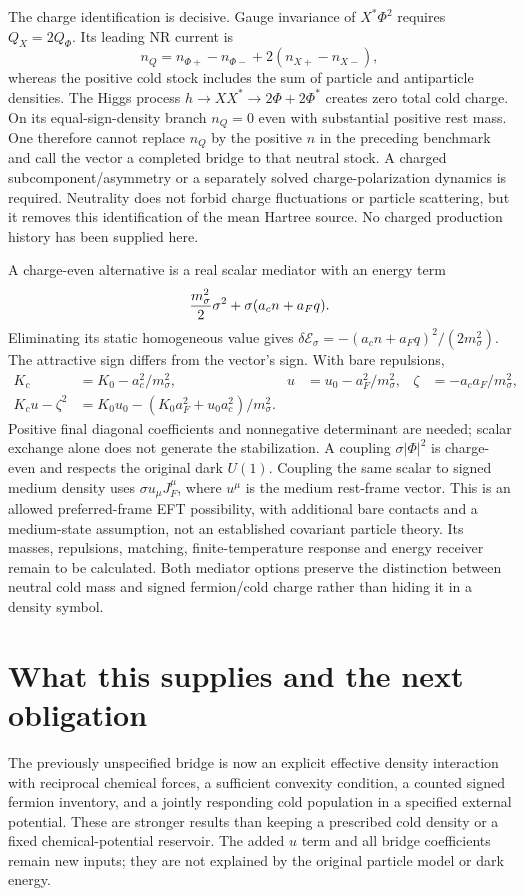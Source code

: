\documentclass[11pt]{article}
\begin{document}
The charge identification is decisive. Gauge invariance of
$X^*\Phi^2$ requires $Q_X=2Q_\Phi$. Its leading NR current is
\begin{equation}
 n_Q=n_{\Phi+}-n_{\Phi-}+2(n_{X+}-n_{X-}),
\end{equation}
whereas the positive cold stock includes the sum of particle and antiparticle
densities. The Higgs process $h\to XX^*\to2\Phi+2\Phi^*$ creates
zero total cold charge. On its equal-sign-density branch $n_Q=0$ even
with substantial positive rest mass. One therefore cannot replace $n_Q$
by the positive $n$ in the preceding benchmark and call the vector a
completed bridge to that neutral stock. A charged subcomponent/asymmetry
or a separately solved charge-polarization dynamics is required.
Neutrality does not forbid charge fluctuations or particle scattering,
but it removes this
identification of the mean Hartree source. No charged production history
has been supplied here.

A charge-even alternative is a real scalar mediator with an energy term
\begin{equation}
 {m_\sigma^2\over2}\sigma^2+\sigma(a_cn+a_Fq).
\end{equation}
Eliminating its static homogeneous value gives
$\delta\mathcal E_\sigma=-(a_cn+a_Fq)^2/(2m_\sigma^2)$.
The attractive sign differs from the vector's sign. With bare repulsions,
\begin{align}
 K_c&=K_0-a_c^2/m_\sigma^2,&
 u&=u_0-a_F^2/m_\sigma^2,&
 \zeta&=-a_ca_F/m_\sigma^2,\\
 K_cu-\zeta^2&=K_0u_0-
              (K_0a_F^2+u_0a_c^2)/m_\sigma^2.
\end{align}
Positive final diagonal coefficients and nonnegative determinant are
needed; scalar exchange alone does not generate the stabilization.
A coupling $\sigma|\Phi|^2$ is charge-even and respects the original
dark $U(1)$. Coupling the same scalar to signed medium density uses
$\sigma u_\mu J_F^\mu$, where $u^\mu$ is the medium rest-frame vector.
This is an allowed preferred-frame EFT possibility, with additional bare
contacts and a medium-state assumption, not an established covariant
particle theory. Its masses, repulsions, matching, finite-temperature
response and energy receiver remain to be calculated. Both mediator
options preserve the distinction between neutral cold mass and signed
fermion/cold charge rather than hiding it in a density symbol.

\section{What this supplies and the next obligation}
The previously unspecified bridge is now an explicit effective density
interaction with reciprocal chemical forces, a sufficient convexity
condition, a counted signed fermion inventory, and a jointly responding
cold population in a specified external potential. These are stronger
results than keeping a prescribed cold density or a fixed chemical-potential
reservoir. The added $u$ term and all bridge coefficients remain new inputs;
they are not explained by the original particle model or dark energy.
\end{document}
